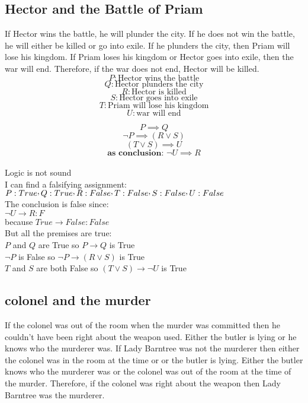 \documentclass[a4paper,12pt]{article}
\newcommand{\CommaPunct}{\mathpunct{\raisebox{0.5ex}{,}}}
\begin{document}
\pagebreak

\subsection{Hector and the Battle of Priam} 
If Hector wins the battle, he will plunder the city.  If he does not win the battle, he will either be killed or go into exile.  If he plunders the city, then Priam will lose his kingdom.  If Priam loses his kingdom or Hector goes into exile, then the war will end.  Therefore, if the war does not end, Hector will be killed. 
\[
P: \text{Hector wins the battle} 
\]
\[
Q: \text{Hector plunders the city} 
\]
\[
R: \text{Hector is killed} 
\]
\[
S: \text{Hector goes into exile}
\]
\[
T: \text{Priam will lose his kingdom}
\]
\[
U: \text{war will end}
\]

\begin{equation} 
P \implies Q 
\end{equation}
\begin{equation} 
\neg P \implies (R \vee S)
\end{equation}
\begin{equation} 
(T \vee S) \implies U
\end{equation}
\begin{equation} 
\textbf{as conclusion: } \neg U \implies R
\end{equation}\\
Logic is not sound\\
I can find a falsifying assignment:\\
$P:True \CommaPunct Q:True \CommaPunct R:False\CommaPunct T:False \CommaPunct S:False \CommaPunct  U:False$\\
The conclusion is false since:\\
$\lnot U \rightarrow R : F$\\
because $True \rightarrow False : False$\\
But all the premises are true:\\
$P$ and $Q$ are True so $P \rightarrow Q$ is True\\
$\lnot P$ is False so $ \neg P \rightarrow(R \vee S)$ is True\\
$T$ and $S$ are both False so $ (T \vee S) \rightarrow \lnot U$ is True\\

\pagebreak
\subsection{colonel and the murder}
If the colonel was out of the room when the murder was committed then he couldn't have been right about the weapon used.  Either the butler is lying or he knows who the murderer was.  If Lady Barntree was not the murderer then either the colonel was in the room at the time or or the butler is lying.  Either the butler knows who the murderer was or the colonel was out of the room at the time of the murder.  Therefore, if the colonel was right about the weapon then Lady Barntree was the murderer.
\end{document}
